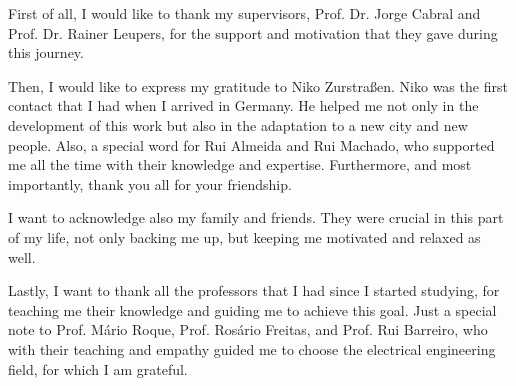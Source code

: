 
First of all, I would like to thank my supervisors, Prof. Dr. Jorge Cabral and Prof. Dr. Rainer Leupers, for the support and motivation that 
they gave during this journey.

Then, I would like to express my gratitude to Niko Zurstraßen. Niko was the first contact that I had when I arrived in Germany. He helped me 
not only in the development of this work but also in the adaptation to a new city and new people. Also, a special word for Rui Almeida and 
Rui Machado, who supported me all the time with their knowledge and expertise. Furthermore, and most importantly, thank you all for your 
friendship.

I want to acknowledge also my family and friends. They were crucial in this part of my life, not only backing me up, 
but keeping me motivated and relaxed as well.

Lastly, I want to thank all the professors that I had since I started studying, for teaching me their knowledge and guiding me to achieve this 
goal. Just a special note to Prof. Mário Roque, Prof. Rosário Freitas, and Prof. Rui Barreiro, who with their teaching and empathy guided me to 
choose the electrical engineering field, for which I am grateful.
